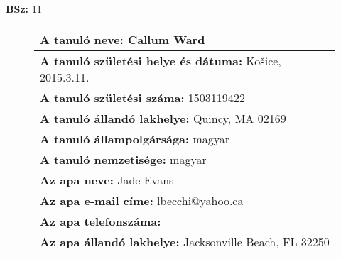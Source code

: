 \documentclass[10pt,a4paper]{article}
\begin{document}
    \vfill
    \textbf{BSz: }11
\newpage
    \begin{figure}[!ht]
    \begin{tabular}{|m{\textwidth}|}
    \hline \vspace{3pt}
    \textbf{A tanuló neve:} \hspace{0.5cm} Callum Ward \vspace{3pt} \\
\hline\vspace{3pt}
\textbf{A tanuló születési helye és dátuma:} \hspace{0.5cm} Košice, 2015.3.11. \vspace{3pt} \\
\hline\vspace{3pt}
\textbf{A tanuló születési száma:} \hspace{0.5cm} 1503119422 \vspace{3pt} \\
\hline\vspace{3pt}
\textbf{A tanuló állandó lakhelye:} \hspace{0.5cm} Quincy, MA 02169 \vspace{3pt} \\
\hline\vspace{3pt}
\textbf{A tanuló állampolgársága:} \hspace{0.5cm} magyar \vspace{3pt} \\
\hline\vspace{3pt}
\textbf{A tanuló nemzetisége:} \hspace{0.5cm} magyar \vspace{3pt} \\
\hline\vspace{3pt}
\textbf{Az apa neve:} \hspace{0.5cm} Jade Evans \vspace{3pt} \\
\hline\vspace{3pt}
\textbf{Az apa e-mail címe:} \hspace{0.5cm} lbecchi@yahoo.ca \vspace{3pt} \\
\hline\vspace{3pt}
\textbf{Az apa telefonszáma:} \hspace{0.5cm}  \vspace{3pt} \\
\hline\vspace{3pt}
\textbf{Az apa állandó lakhelye:} \hspace{0.5cm} Jacksonville Beach, FL 32250 \vspace{3pt} \\

\end{tabular}
\end{figure}
\end{document}
